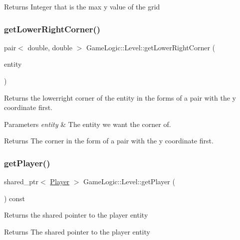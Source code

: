 \begin{DoxyReturn}{Returns}
Integer that is the max y value of the grid 
\end{DoxyReturn}
\mbox{\label{classGameLogic_1_1Level_a0a4b3dacec30ac1de1a2170082a9d799}} 
\subsubsection{\texorpdfstring{get\+Lower\+Right\+Corner()}{getLowerRightCorner()}}
{\footnotesize\ttfamily pair$<$ double, double $>$ Game\+Logic\+::\+Level\+::get\+Lower\+Right\+Corner (\begin{DoxyParamCaption}\item[{shared\+\_\+ptr$<$ \hyperlink{classGameLogic_1_1Entity}{Entity} $>$}]{entity }\end{DoxyParamCaption})}

Returns the lowerright corner of the entity in the forms of a pair with the y coordinate first. 
\begin{DoxyParams}{Parameters}
{\em entity} & The entity we want the corner of. \\
\hline
\end{DoxyParams}
\begin{DoxyReturn}{Returns}
The corner in the form of a pair with the y coordinate first. 
\end{DoxyReturn}
\mbox{\label{classGameLogic_1_1Level_a76420d9e37505a2e5cbbbe8c4f57adbe}} 
\subsubsection{\texorpdfstring{get\+Player()}{getPlayer()}}
{\footnotesize\ttfamily shared\+\_\+ptr$<$ \hyperlink{classGameLogic_1_1Player}{Player} $>$ Game\+Logic\+::\+Level\+::get\+Player (\begin{DoxyParamCaption}{ }\end{DoxyParamCaption}) const}

Returns the shared pointer to the player entity \begin{DoxyReturn}{Returns}
The shared pointer to the player entity 
\end{DoxyReturn}
\mbox{\label{classGameLogic_1_1Level_a6fdeff89393edde1156f75ccab640c79}} 
